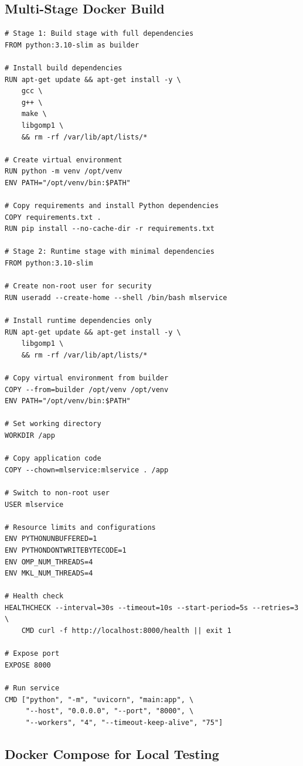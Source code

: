 \subsection{Multi-Stage Docker Build}

\begin{lstlisting}[style=shell, caption={Production Dockerfile with Multi-Stage Build}]
# Stage 1: Build stage with full dependencies
FROM python:3.10-slim as builder

# Install build dependencies
RUN apt-get update && apt-get install -y \
    gcc \
    g++ \
    make \
    libgomp1 \
    && rm -rf /var/lib/apt/lists/*

# Create virtual environment
RUN python -m venv /opt/venv
ENV PATH="/opt/venv/bin:$PATH"

# Copy requirements and install Python dependencies
COPY requirements.txt .
RUN pip install --no-cache-dir -r requirements.txt

# Stage 2: Runtime stage with minimal dependencies
FROM python:3.10-slim

# Create non-root user for security
RUN useradd --create-home --shell /bin/bash mlservice

# Install runtime dependencies only
RUN apt-get update && apt-get install -y \
    libgomp1 \
    && rm -rf /var/lib/apt/lists/*

# Copy virtual environment from builder
COPY --from=builder /opt/venv /opt/venv
ENV PATH="/opt/venv/bin:$PATH"

# Set working directory
WORKDIR /app

# Copy application code
COPY --chown=mlservice:mlservice . /app

# Switch to non-root user
USER mlservice

# Resource limits and configurations
ENV PYTHONUNBUFFERED=1
ENV PYTHONDONTWRITEBYTECODE=1
ENV OMP_NUM_THREADS=4
ENV MKL_NUM_THREADS=4

# Health check
HEALTHCHECK --interval=30s --timeout=10s --start-period=5s --retries=3 \
    CMD curl -f http://localhost:8000/health || exit 1

# Expose port
EXPOSE 8000

# Run service
CMD ["python", "-m", "uvicorn", "main:app", \
     "--host", "0.0.0.0", "--port", "8000", \
     "--workers", "4", "--timeout-keep-alive", "75"]
\end{lstlisting}

\subsection{Docker Compose for Local Testing}

